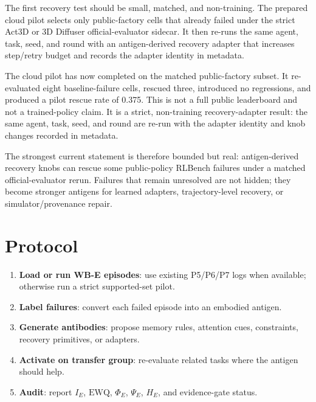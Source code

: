 \documentclass[11pt]{article}
\begin{document}
The first recovery test should be small, matched, and non-training.
The prepared cloud pilot selects only public-factory cells that already failed under the strict Act3D or 3D Diffuser official-evaluator sidecar.
It then re-runs the same agent, task, seed, and round with an antigen-derived recovery adapter that increases step/retry budget and records the adapter identity in metadata.

\begin{table}[t]
\centering
\scriptsize
\caption{P9 recovery-adapter cloud pilot plan. The matrix is generated from offline antigens and selects only matched public-factory failures.}
\label{tab:recovery_adapter_plan}

\end{table}

The cloud pilot has now completed on the matched public-factory subset.
It re-evaluated eight baseline-failure cells, rescued three, introduced no regressions, and produced a pilot rescue rate of 0.375.
This is not a full public leaderboard and not a trained-policy claim.
It is a strict, non-training recovery-adapter result: the same agent, task, seed, and round are re-run with the adapter identity and knob changes recorded in metadata.

\begin{table}[t]
\centering
\scriptsize
\caption{Completed P9 recovery-adapter pilot. Rescues are counted only when the matched baseline row failed and the adapter row succeeded. Raw rows, cloud log, and archived sidecar artifacts are indexed in the evidence manifest.}
\label{tab:recovery_adapter_result}

\end{table}

The strongest current statement is therefore bounded but real: antigen-derived recovery knobs can rescue some public-policy RLBench failures under a matched official-evaluator rerun.
Failures that remain unresolved are not hidden; they become stronger antigens for learned adapters, trajectory-level recovery, or simulator/provenance repair.

\section{Protocol}

\begin{enumerate}[leftmargin=*]
  \item \textbf{Load or run WB-E episodes}: use existing P5/P6/P7 logs when available; otherwise run a strict supported-set pilot.
  \item \textbf{Label failures}: convert each failed episode into an embodied antigen.
  \item \textbf{Generate antibodies}: propose memory rules, attention cues, constraints, recovery primitives, or adapters.
  \item \textbf{Activate on transfer group}: re-evaluate related tasks where the antigen should help.
  \item \textbf{Audit}: report $I_E$, $\mathrm{EWQ}$, $\Phi_E$, $\Psi_E$, $H_E$, and evidence-gate status.
\end{enumerate}
\end{document}
